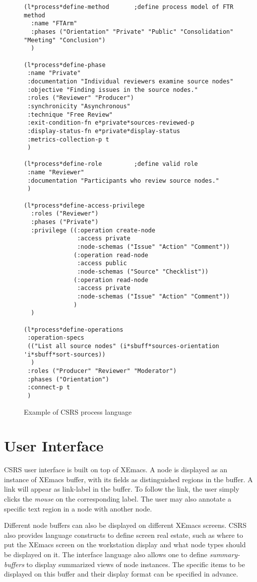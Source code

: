\begin{figure}[tp]
  \footnotesize
  \begin{verbatim}
(l*process*define-method       ;define process model of FTR method
  :name "FTArm"                
  :phases ("Orientation" "Private" "Public" "Consolidation" "Meeting" "Conclusion")
  )

(l*process*define-phase
 :name "Private"
 :documentation "Individual reviewers examine source nodes"
 :objective "Finding issues in the source nodes."
 :roles ("Reviewer" "Producer")
 :synchronicity "Asynchronous"
 :technique "Free Review"
 :exit-condition-fn e*private*sources-reviewed-p
 :display-status-fn e*private*display-status
 :metrics-collection-p t
 )

(l*process*define-role         ;define valid role
 :name "Reviewer"
 :documentation "Participants who review source nodes."
 )

(l*process*define-access-privilege 
  :roles ("Reviewer")
  :phases ("Private")
  :privilege ((:operation create-node 
               :access private 
               :node-schemas ("Issue" "Action" "Comment"))
              (:operation read-node 
               :access public 
               :node-schemas ("Source" "Checklist"))
              (:operation read-node
               :access private
               :node-schemas ("Issue" "Action" "Comment"))
              )
  )

(l*process*define-operations
 :operation-specs 
 (("List all source nodes" (i*sbuff*sources-orientation 'i*sbuff*sort-sources))
  )
 :roles ("Producer" "Reviewer" "Moderator")
 :phases ("Orientation")
 :connect-p t
 )

  \end{verbatim}
  \normalsize
  \caption{Example of CSRS process language}
  \label{fig:process-language}
\end{figure}


\section{User Interface}

CSRS user interface is built on top of XEmacs.
A node is displayed as an instance of XEmacs
buffer, with its fields as distinguished regions in the buffer. A link
will appear as link-label in the buffer. To follow the link, the user
simply clicks the {\it mouse} on the corresponding label. The
user may also annotate a 
specific text region in a node with another node.

Different node buffers can also be displayed on different XEmacs screens. 
CSRS also provides language constructs to define screen real estate,
such as where to put the XEmacs screen on the workstation display and
what node types should be displayed on it.
The interface language also allows one to define
{\it summary-buffers} to display summarized views of node instances. 
The specific items to be displayed on this buffer and their display
format can be specified in advance. 

